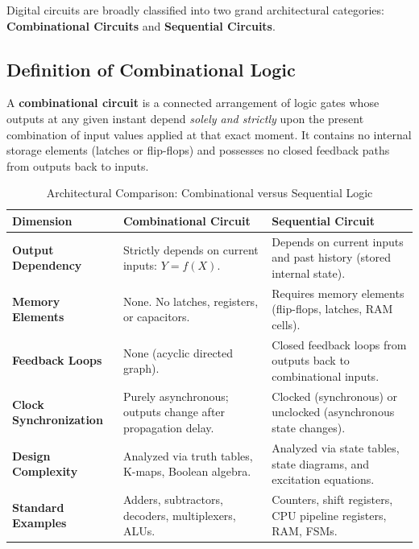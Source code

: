 Digital circuits are broadly classified into two grand architectural categories: \textbf{Combinational Circuits} and \textbf{Sequential Circuits}.

\subsection{Definition of Combinational Logic}
A \textbf{combinational circuit} is a connected arrangement of logic gates whose outputs at any given instant depend \textit{solely and strictly} upon the present combination of input values applied at that exact moment. It contains no internal storage elements (latches or flip-flops) and possesses no closed feedback paths from outputs back to inputs.

\begin{table}[htbp]
\centering
\small
\caption{Architectural Comparison: Combinational versus Sequential Logic}
\label{tab:comb_vs_seq}
\begin{tabularx}{\textwidth}{l X X}
\toprule
\textbf{Dimension} & \textbf{Combinational Circuit} & \textbf{Sequential Circuit} \\
\midrule
\textbf{Output Dependency} & Strictly depends on current inputs: $Y = f(X)$. & Depends on current inputs and past history (stored internal state). \\
\textbf{Memory Elements} & None. No latches, registers, or capacitors. & Requires memory elements (flip-flops, latches, RAM cells). \\
\textbf{Feedback Loops} & None (acyclic directed graph). & Closed feedback loops from outputs back to combinational inputs. \\
\textbf{Clock Synchronization} & Purely asynchronous; outputs change after propagation delay. & Clocked (synchronous) or unclocked (asynchronous state changes). \\
\textbf{Design Complexity} & Analyzed via truth tables, K-maps, Boolean algebra. & Analyzed via state tables, state diagrams, and excitation equations. \\
\textbf{Standard Examples} & Adders, subtractors, decoders, multiplexers, ALUs. & Counters, shift registers, CPU pipeline registers, RAM, FSMs. \\
\bottomrule
\end{tabularx}
\end{table}

